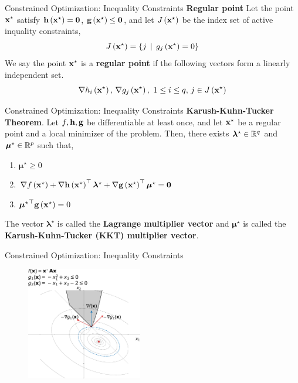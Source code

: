 \documentclass[aspectratio=169]{beamer}
\let\olditem\item
\renewcommand{\item}{\setlength{\itemsep}{\fill}\olditem}
\def\mf{\ensuremath\mathbf}
\def\mb{\ensuremath\mathbb}
\def\lp{\ensuremath\left(}
\def\rp{\ensuremath\right)}
\def\lc{\ensuremath\left\{}
\def\rc{\ensuremath\right\}}
\def\R{\ensuremath\mb{R}}
\newcommand{\ct}[1]{\lp #1\rp}
\begin{document}
\begin{frame}[t]{Constrained Optimization: Inequality Constraints}
  \textbf{Regular point} Let the point $\mf{x}^\star$ satisfy $\mf{h}\ct{\mf{x}^\star} = \mf{0}$, $\mf{g}\ct{\mf{x}^\star} \leq \mf{0}$, and let $J\ct{\mf{x}^\star}$ be the index set of active inquality constraints,
  \[ J\ct{\mf{x}^\star} = \lc j \, \mid \, g_j\ct{\mf{x}^\star} = 0 \rc \]
  We say the point $\mf{x}^\star$ is a \textbf{regular point} if the following vectors form a linearly independent set.
  \[ \nabla h_i\ct{\mf{x}^\star}, \, \nabla g_j\ct{\mf{x}^\star}, \,\, 1 \leq i \leq q, \, j \in J\ct{\mf{x}^\star} \]
\end{frame}


\begin{frame}[t]{Constrained Optimization: Inequality Constraints}
  \textbf{Karush-Kuhn-Tucker Theorem}. Let $f, \mf{h}, \mf{g}$ be differentiable at least once, and let $\mf{x}^\star$ be a regular point and a local minimizer of the problem. Then, there exists $\bm{\lambda}^\star \in \R^q$ and $\bm{\mu}^\star \in \R^p$ such that,
  \begin{enumerate}
    \item $\bm{\mu}^\star \geq 0$
    \item $\nabla f\ct{\mf{x}^\star} + \nabla \mf{h}\ct{\mf{x}^\star}^\top {\bm{\lambda}^\star} + \nabla \mf{g}\ct{\mf{x}^\star}^\top {\bm{\mu}^\star} = \mf{0}$
    \item ${\bm{\mu}^\star}^\top \mf{g}\ct{\mf{x}^\star} = 0$
  \end{enumerate}
  \vspace{1cm}

  The vector $\bm{\lambda}^\star$ is called the \textbf{Lagrange multiplier vector} and $\bm{\mu}^\star$ is called the \textbf{Karush-Kuhn-Tucker (KKT) multiplier vector}.
  \vfill
\end{frame}


\begin{frame}[t]{Constrained Optimization: Inequality Constraints}
  \begin{figure}
    \centering
    \includegraphics[width=0.45\textwidth]{figs/ineq_const.pdf}
  \end{figure}
\end{frame}
\end{document}
